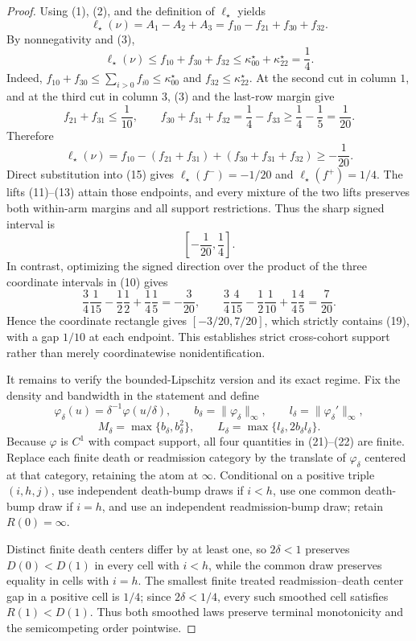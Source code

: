 \documentclass{article}
\begin{document}
\begin{proof}
Using (1), (2), and the definition of \(\ell_\star\) yields
\[
 \ell_\star(\nu)=A_1-A_2+A_3
 =f_{10}-f_{21}+f_{30}+f_{32}. \tag{15}
\]
By nonnegativity and (3),
\[
 \ell_\star(\nu)
 \leq f_{10}+f_{30}+f_{32}
 \leq\kappa^\star_{00}+\kappa^\star_{22}
 =\frac14. \tag{16}
\]
Indeed, \(f_{10}+f_{30}\leq\sum_{i>0}f_{i0}\leq\kappa^\star_{00}\) and \(f_{32}\leq\kappa^\star_{22}\).  At the second cut in column \(1\), and at the third cut in column \(3\), (3) and the last-row margin give
\[
 f_{21}+f_{31}\leq\frac1{10},\qquad
 f_{30}+f_{31}+f_{32}
 =\frac14-f_{33}\geq\frac14-\frac15=\frac1{20}. \tag{17}
\]
Therefore
\[
 \ell_\star(\nu)
 =f_{10}-(f_{21}+f_{31})+(f_{30}+f_{31}+f_{32})
 \geq-\frac1{20}. \tag{18}
\]
Direct substitution into (15) gives \(\ell_\star(f^-)=-1/20\) and \(\ell_\star(f^+)=1/4\).  The lifts (11)--(13) attain those endpoints, and every mixture of the two lifts preserves both within-arm margins and all support restrictions.  Thus the sharp signed interval is
\[
 \left[-\frac1{20},\frac14\right]. \tag{19}
\]
In contrast, optimizing the signed direction over the product of the three coordinate intervals in (10) gives
\[
 \frac34\frac1{15}-\frac12\frac12+\frac14\frac15=-\frac3{20},
 \qquad
 \frac34\frac4{15}-\frac12\frac1{10}+\frac14\frac45=\frac7{20}. \tag{20}
\]
Hence the coordinate rectangle gives \([-3/20,7/20]\), which strictly contains (19), with a gap \(1/10\) at each endpoint.  This establishes strict cross-cohort support rather than merely coordinatewise nonidentification.

It remains to verify the bounded-Lipschitz version and its exact regime.  Fix the density and bandwidth in the statement and define
\[
 \varphi_\delta(u)=\delta^{-1}\varphi(u/\delta),\qquad
 b_\delta=\|\varphi_\delta\|_\infty,\qquad
 l_\delta=\|\varphi_\delta'\|_\infty,
\tag{21}
\]
\[
 M_\delta=\max\{b_\delta,b_\delta^2\},\qquad
 L_\delta=\max\{l_\delta,2b_\delta l_\delta\}. \tag{22}
\]
Because \(\varphi\) is \(C^1\) with compact support, all four quantities in (21)--(22) are finite.  Replace each finite death or readmission category by the translate of \(\varphi_\delta\) centered at that category, retaining the atom at \(\infty\).  Conditional on a positive triple \((i,h,j)\), use independent death-bump draws if \(i<h\), use one common death-bump draw if \(i=h\), and use an independent readmission-bump draw; retain \(R(0)=\infty\).

Distinct finite death centers differ by at least one, so \(2\delta<1\) preserves \(D(0)<D(1)\) in every cell with \(i<h\), while the common draw preserves equality in cells with \(i=h\).  The smallest finite treated readmission--death center gap in a positive cell is \(1/4\); since \(2\delta<1/4\), every such smoothed cell satisfies \(R(1)<D(1)\).  Thus both smoothed laws preserve terminal monotonicity and the semicompeting order pointwise.


\end{proof}
\end{document}
